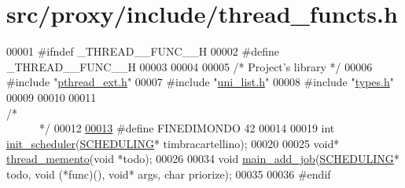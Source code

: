 \hypertarget{thread__functs_8h_source}{
\section{src/proxy/include/thread\_\-functs.h}
}

\begin{DoxyCode}
00001 \textcolor{preprocessor}{#ifndef \_THREAD\_\_FUNC\_\_H}
00002 \textcolor{preprocessor}{}\textcolor{preprocessor}{#define \_THREAD\_\_FUNC\_\_H}
00003 \textcolor{preprocessor}{}
00004 
00005 \textcolor{comment}{/*      Project's library       */}
00006 \textcolor{preprocessor}{#include        "\hyperlink{pthread__ext_8h}{pthread_ext.h}"}
00007 \textcolor{preprocessor}{#include        "\hyperlink{uni__list_8h}{uni_list.h}"}
00008 \textcolor{preprocessor}{#include        "\hyperlink{types_8h}{types.h}"}
00009 
00010 
00011 \textcolor{comment}{/*~~~~~~~~~~~~~~~~~~~~~~~~~~~~~~~~~~~~~~~~~~~~~~~~~~~~~~~~~~~~~~~~~~~~~~~~~~~~*/}
00012 
\hypertarget{thread__functs_8h_source_l00013}{}\hyperlink{thread__functs_8h_ab825729d75fcc98272d161634032627d}{00013} \textcolor{preprocessor}{#define  FINEDIMONDO            42}
00014 \textcolor{preprocessor}{}
00019 \textcolor{keywordtype}{int} \hyperlink{thread__functs_8h_a65378e0cbf18e07d6f49f2dd18736682}{init_scheduler}(\hyperlink{structSCHEDULING}{SCHEDULING}* timbracartellino);
00020 
00025 \textcolor{keywordtype}{void}* \hyperlink{thread__functs_8h_afec81b17a0b6bf2a742d2106d26fa914}{thread_memento}(\textcolor{keywordtype}{void} *todo);
00026 
00034 \textcolor{keywordtype}{void} \hyperlink{thread__functs_8h_a4fa7231e40ca78ec024045b8dd2ac964}{main_add_job}(\hyperlink{structSCHEDULING}{SCHEDULING}* todo, \textcolor{keywordtype}{void} (*func)(), \textcolor{keywordtype}{void}* args, \textcolor{keywordtype}{char} priorize);
00035 
00036 \textcolor{preprocessor}{#endif}
\end{DoxyCode}
